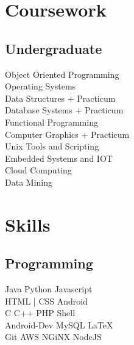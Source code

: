 \documentclass[]{deedy-resume-openfont}
\begin{document}
\begin{minipage}[t]{0.33\textwidth}
\section{Coursework}

\subsection{Undergraduate}
Object Oriented Programming \\
Operating Systems \\
Data Structures + Practicum \\
Database Systems + Practicum \\
Functional Programming \\
Computer Graphics + Practicum \\
Unix Tools and Scripting \\
Embedded Systems and IOT \\
\vspace{3pt} %
Cloud Computing\\
Data Mining\\

\section{Skills}
\subsection{Programming}
Java \textbullet{} Python \textbullet{} Javascript \\
\textbullet{} HTML | CSS \textbullet{} Android  \\ 
C \textbullet{} C++ \textbullet{} PHP \textbullet{} Shell \\
Android-Dev \textbullet{} MySQL \textbullet{} \LaTeX \\
Git \textbullet{} AWS \textbullet{} NGiNX \textbullet{} NodeJS



\end{minipage}
\end{document}
